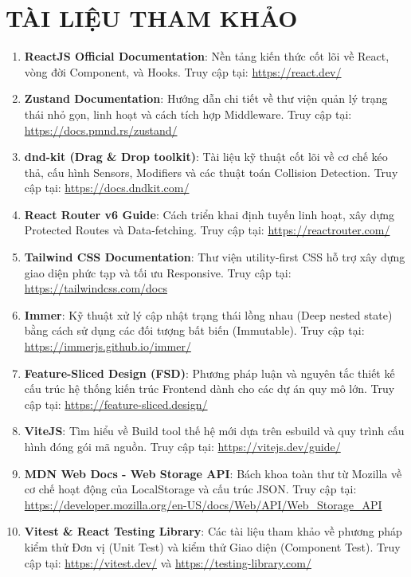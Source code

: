 \chapter*{TÀI LIỆU THAM KHẢO}

\begin{enumerate}
    \item \textbf{ReactJS Official Documentation}: Nền tảng kiến thức cốt lõi về React, vòng đời Component, và Hooks. Truy cập tại: \url{https://react.dev/}
    \item \textbf{Zustand Documentation}: Hướng dẫn chi tiết về thư viện quản lý trạng thái nhỏ gọn, linh hoạt và cách tích hợp Middleware. Truy cập tại: \url{https://docs.pmnd.rs/zustand/}
    \item \textbf{dnd-kit (Drag \& Drop toolkit)}: Tài liệu kỹ thuật cốt lõi về cơ chế kéo thả, cấu hình Sensors, Modifiers và các thuật toán Collision Detection. Truy cập tại: \url{https://docs.dndkit.com/}
    \item \textbf{React Router v6 Guide}: Cách triển khai định tuyến linh hoạt, xây dựng Protected Routes và Data-fetching. Truy cập tại: \url{https://reactrouter.com/}
    \item \textbf{Tailwind CSS Documentation}: Thư viện utility-first CSS hỗ trợ xây dựng giao diện phức tạp và tối ưu Responsive. Truy cập tại: \url{https://tailwindcss.com/docs}
    \item \textbf{Immer}: Kỹ thuật xử lý cập nhật trạng thái lồng nhau (Deep nested state) bằng cách sử dụng các đối tượng bất biến (Immutable). Truy cập tại: \url{https://immerjs.github.io/immer/}
    \item \textbf{Feature-Sliced Design (FSD)}: Phương pháp luận và nguyên tắc thiết kế cấu trúc hệ thống kiến trúc Frontend dành cho các dự án quy mô lớn. Truy cập tại: \url{https://feature-sliced.design/}
    \item \textbf{ViteJS}: Tìm hiểu về Build tool thế hệ mới dựa trên esbuild và quy trình cấu hình đóng gói mã nguồn. Truy cập tại: \url{https://vitejs.dev/guide/}
    \item \textbf{MDN Web Docs - Web Storage API}: Bách khoa toàn thư từ Mozilla về cơ chế hoạt động của LocalStorage và cấu trúc JSON. Truy cập tại: \url{https://developer.mozilla.org/en-US/docs/Web/API/Web_Storage_API}
    \item \textbf{Vitest \& React Testing Library}: Các tài liệu tham khảo về phương pháp kiểm thử Đơn vị (Unit Test) và kiểm thử Giao diện (Component Test). Truy cập tại: \url{https://vitest.dev/} và \url{https://testing-library.com/}
\end{enumerate}

